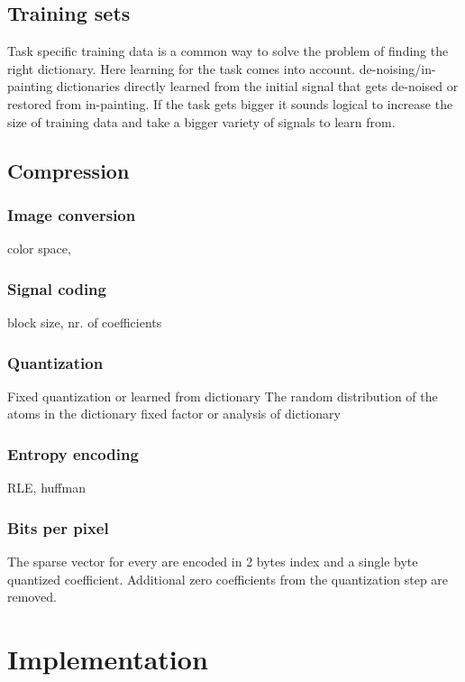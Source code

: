 \subsection{Training sets}
Task specific training data is a common way to solve the problem of finding the right dictionary. 
Here learning for the task comes into account. de-noising/in-painting dictionaries directly learned from the initial
signal that gets de-noised or restored from in-painting.
If the task gets bigger it sounds logical to increase the size of training data and take a bigger variety of signals to learn from.



\subsection{Compression}
\subsubsection*{Image conversion}
color space, 
\subsubsection*{Signal coding}
block size, nr. of coefficients
\subsubsection*{Quantization}
Fixed quantization or learned from dictionary
The random distribution of the atoms in the dictionary 
fixed factor or analysis of dictionary
\subsubsection*{Entropy encoding}
RLE, huffman
\subsubsection*{Bits per pixel}
The sparse vector for every are encoded in 2 bytes index and a single byte quantized coefficient. Additional zero coefficients from the quantization step are removed.





\section{Implementation}
%

